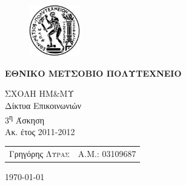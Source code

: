 \begin{titlepage}
\begin{center}
\begin{figure}[h] 
     \includegraphics[width=0.2\textwidth]{title/ntua_logo}
\end{figure}
\vspace{1cm}
\begin{LARGE}\textbf{ΕΘΝΙΚΟ ΜΕΤΣΟΒΙΟ ΠΟΛΥΤΕΧΝΕΙΟ\\[1.5cm]}\end{LARGE}
\begin{Large}
ΣΧΟΛΗ ΗΜ\&ΜΥ\\
Δίκτυα Επικοινωνιών\\[2cm]
3\textsuperscript{η} Άσκηση\\
Ακ. έτος 2011-2012\\
\end{Large}
\vfill
\begin{flushright}
\begin{tabular}{l r}
{Γρηγόρης \textsc{Λύρας}}&
{Α.Μ.: 03109687}\\
\end{tabular}
\end{flushright}

\large\today\\
\end{center}
\end{titlepage}


